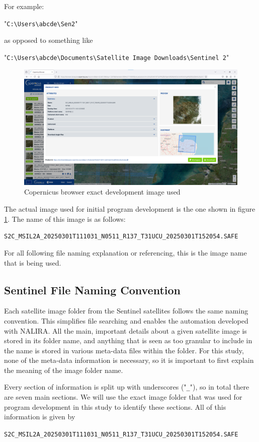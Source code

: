 For example:

"\verb|C:\Users\abcde\Sen2|" 

as opposed to something like 

"\verb|C:\Users\abcde\Documents\Satellite Image Downloads\Sentinel 2|"

\begin{figure}[H]
    \centering
    \includegraphics[width=0.5\linewidth]{contents/figures/ME copernicus exact chunk.jpg}
    \caption{Copernicus browser exact development image used}
    \label{fig:ME copernicus exact image}
\end{figure}
The actual image used for initial program development is the one shown in figure \ref{fig:ME copernicus exact image}. The name of this image is as follows: 

\verb|S2C_MSIL2A_20250301T111031_N0511_R137_T31UCU_20250301T152054.SAFE|

For all following file naming explanation or referencing, this is the image name that is being used. 

\subsection{Sentinel File Naming Convention}
Each satellite image folder from the Sentinel satellites follows the same naming convention. This simplifies file searching and enables the automation developed with NALIRA. All the main, important details about a given satellite image is stored in its folder name, and anything that is seen as too granular to include in the name is stored in various meta-data files within the folder. For this study, none of the meta-data information is necessary, so it is important to first explain the meaning of the image folder name. 

Every section of information is split up with underscores ("\verb|_|"), so in total there are seven main sections. We will use the exact image folder that was used for program development in this study to identify these sections. All of this information is given by \cite{copernicus_2025}

\verb|S2C_MSIL2A_20250301T111031_N0511_R137_T31UCU_20250301T152054.SAFE|

